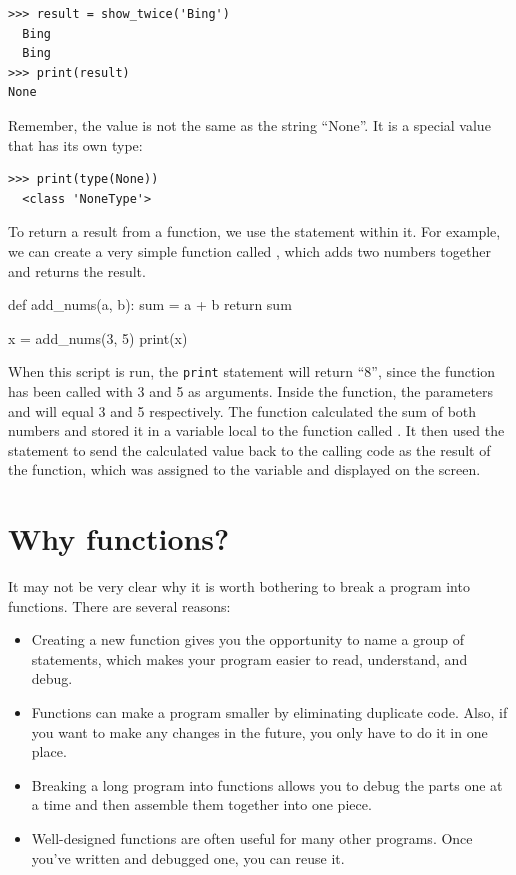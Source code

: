  

\begin{Verbatim}[frame=single]
>>> result = show_twice('Bing')
  Bing
  Bing
>>> print(result)
None
\end{Verbatim}

Remember, the value  is not the same as the string ``None''. It is a special value that has its own type:

\begin{Verbatim}[frame=single]
>>> print(type(None))
  <class 'NoneType'>
\end{Verbatim}

To return a result from a function, we use the  statement within it. For example, we can create a very simple function called , which adds two numbers together and returns the result.

\begin{python}[frame=single]
def add_nums(a, b):
    sum = a + b
    return sum

x = add_nums(3, 5)
print(x)
\end{python}

When this script is run, the \texttt{print} statement will return ``8'', since the  function has been called with 3 and 5 as arguments. Inside the function, the parameters  and  will equal 3 and 5 respectively. The function calculated the sum of both numbers and stored it in a variable local to the function called . It then used the  statement to send the calculated value back to the calling code as the result of the function, which was assigned to the variable  and displayed on the screen.

\hypertarget{por-quuxe9-funciones}{%
\section{Why functions?}\label{por-quuxe9-funciones}}



It may not be very clear why it is worth bothering to break a program into functions. There are several reasons:

\begin{itemize}
\item
  Creating a new function gives you the opportunity to name a group of statements, which makes your program easier to read, understand, and debug.
\item
  Functions can make a program smaller by eliminating duplicate code. Also, if you want to make any changes in the future, you only have to do it in one place.
\item
  Breaking a long program into functions allows you to debug the parts one at a time and then assemble them together into one piece.
\item
  Well-designed functions are often useful for many other programs. Once you've written and debugged one, you can reuse it.
\end{itemize}

